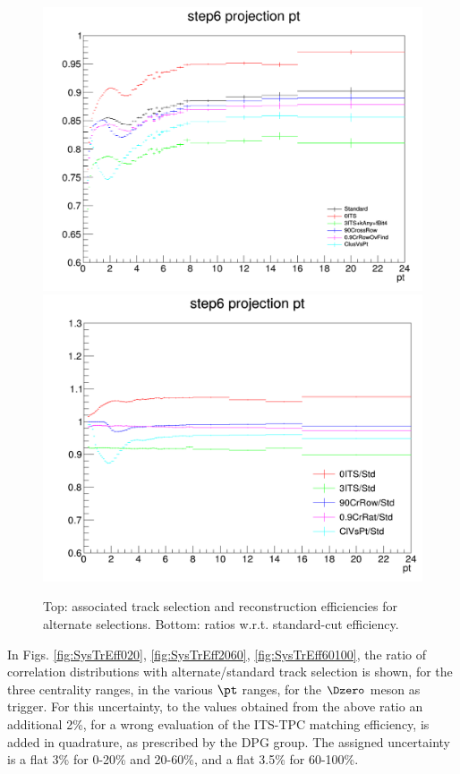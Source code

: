 \begin{figure}
\centering
{\includegraphics[width=0.75\linewidth]{figuresVsCent/Dzero/SystTrackEff/AltTrackEff.png}}
{\includegraphics[width=0.75\linewidth]{figuresVsCent/Dzero/SystTrackEff/AltTrackEffRatios.png}}
\caption{Top: associated track selection and reconstruction efficiencies for alternate selections. Bottom: ratios w.r.t. standard-cut efficiency.}
\label{fig:TrEffVariations}
\end{figure}

In Figs. \ref{fig:SysTrEff020}, \ref{fig:SysTrEff2060}, \ref{fig:SysTrEff60100}, the ratio of correlation distributions with alternate/standard track selection is shown, for the three centrality ranges, in the various $\pt$ ranges, for the $\Dzero$ meson as trigger.
For this uncertainty, to the values obtained from the above ratio an additional 2\%, for a wrong evaluation of the ITS-TPC matching efficiency, is added in quadrature, as prescribed by the DPG group.
The assigned uncertainty is a flat 3\% for 0-20\% and 20-60\%, and a flat 3.5\% for 60-100\%.

